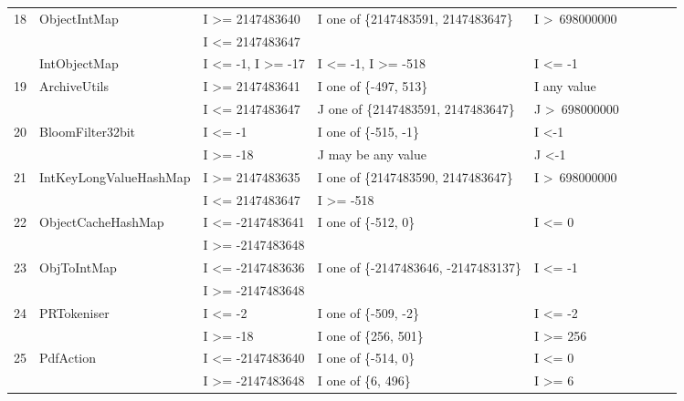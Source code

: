 \documentclass[runningheads,a4paper]{llncs}
\begin{document}
\begin{table}[h]
{{\begin{tabular}{|l|l|l|l|l|l|l|l|l|}
18	& ObjectIntMap				& I \textgreater= 2147483640				& I one of \{2147483591, 2147483647\}    & I \textgreater~698000000			\\ 
	&                                             & I \textless= 2147483647					& 										&  			   						\\	
	& IntObjectMap				& I \textless= -1, I \textgreater= -17			& I \textless= -1, I \textgreater= -518		& I \textless= -1						\\ 
19	& ArchiveUtils				& I \textgreater= 2147483641 				& I one of \{-497, 513\}					& I any value							\\ 
	&                                             & I \textless= 2147483647					& J one of \{2147483591, 2147483647\}	& J \textgreater~698000000 	   		\\	
20	& BloomFilter32bit 			& I \textless= -1								& I one of \{-515, -1\}					& I \textless -1 						\\ 
	&                                             & I \textgreater= -18							& J may be any value						& J \textless -1 			   			\\	
21	& IntKeyLongValueHashMap	& I \textgreater= 2147483635				& I one of \{2147483590, 2147483647\}	& I \textgreater~698000000			\\ 
	&                                             & I \textless= 2147483647					& I \textgreater= -518					&  			   						\\	
22	& ObjectCacheHashMap		& I \textless= -2147483641					& I one of \{-512, 0\}						& I \textless= 0						\\ 
	&                                             & I \textgreater= -2147483648				& 										&  			   						\\	
23	& ObjToIntMap				& I \textless= -2147483636					& I one of \{-2147483646, -2147483137\}	& I \textless= -1						\\ 
	&                                             & I \textgreater= -2147483648				& 										&  			   						\\	
24	& PRTokeniser				& I \textless= -2								& I one of \{-509, -2\}					& I \textless= -2 					\\ 
	&                                             & I \textgreater= -18							& I one of \{256, 501\} 					& I \textgreater= 256		   			\\	
25	& PdfAction					& I \textless= -2147483640 					& I one of \{-514, 0\}						& I \textless= 0 						\\ 
	&                                             & I \textgreater= -2147483648				& I one of \{6, 496\}						& I \textgreater= 6			   		\\	

\end{tabular}}}
\end{table}
\end{document}
